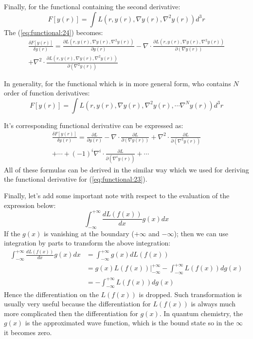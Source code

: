 Finally, for the functional containing the second derivative:
\begin{equation}
  \label{eq:functional:30}
  F[y(r)] = \int L(r, y(r), \nabla y(r), \nabla^{2} y(r)) d^{3}r
\end{equation}
The (\ref{eq:functional:24}) becomes:
\begin{multline}
  \label{eq:functional:31}
  \frac{\delta F[y(r)]}{\delta y(r)} = \frac{\partial L(r, y(r),
    \nabla y(r), \nabla^{2} y(r))} {\partial y(r)} - \nabla \cdot
  \frac{\partial L(r, y(r), \nabla y(r), \nabla^{2} y(r))}
  {\partial (\nabla y(r))} \\
  + \nabla^{2} \cdot \frac{\partial L(r, y(r), \nabla y(r), \nabla^{2}
    y(r) )} {\partial (\nabla^{2} y(r))}
\end{multline}

In generality, for the functional which is in more general form, who
contains $N$ order of function derivatives:
\begin{equation}
  \label{eq:functional:32}
  F[y(r)] = \int L(r, y(r), \nabla y(r), \nabla^{2} y(r), \cdots
  \nabla^{N} y(r)) d^{3}r 
\end{equation}

It's corresponding functional derivative can be expressed as:
\begin{multline}
  \label{eq:functional:33}
  \frac{\delta  F[y(r)]}{\delta y(r)} = \frac{\partial L} {\partial
    y(r)} - \nabla \cdot \frac{\partial L} {\partial (\nabla y(r))} +
  \nabla^{2} \cdot \frac{\partial L} {\partial
    (\nabla^{2} y(r))} \\
  + \cdots + (-1)^{i} \nabla^{i} \cdot \frac{\partial L} {\partial
    (\nabla^{i} y(r))} + \cdots
\end{multline}
All of these formulas can be derived in the similar way which we used
for deriving the functional derivative for (\ref{eq:functional:23}).

Finally, let's add some important note with respect to the evaluation
of the expression below:
\begin{equation}
\int^{+\infty}_{-\infty}\frac{d L(f(x))}{dx} g(x) dx 
\end{equation}
If the $g(x)$ is vanishing at the boundary ($+\infty$ and $-\infty$);
then we can use integration by parts to transform the above
integration:
\begin{align}
 \int^{+\infty}_{-\infty}\frac{d L(f(x))}{dx} g(x) dx &= 
 \int^{+\infty}_{-\infty} g(x) dL(f(x)) \nonumber \\
&= g(x)L(f(x))|^{+\infty}_{-\infty} - \int^{+\infty}_{-\infty} L(f(x))
dg(x) \nonumber \\
&= - \int^{+\infty}_{-\infty} L(f(x)) dg(x)
\end{align}
Hence the differentiation on the $L(f(x))$ is dropped. Such
transformation is usually very useful because the
differentiation for $L(f(x))$ is always much more complicated then
the differentiation for $g(x)$. In quantum chemistry, the $g(x)$ is
the approximated wave function, which is the bound state so in the
$\infty$ it becomes zero. 

